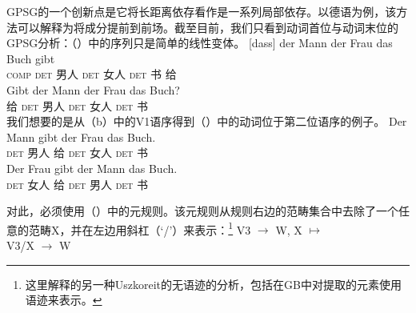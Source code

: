 GPSG的一个创新点是它将长距离依存看作是一系列局部依存\citep{Gazdar81}。以德语为例，该方法可以解释为将成分提前到前场。截至目前，我们只看到动词首位与动词末位的GPSG分析：（）中的序列只是简单的线性变体。
\eal
\ex 
\gll {}[dass] der Mann der Frau das Buch gibt\\
	 {}\spacebr{}\textsc{comp} \textsc{det} 男人 \textsc{det} 女人 \textsc{det} 书 给\\
\ex 
\gll Gibt der Mann der Frau das Buch?\\
	 给 \textsc{det} 男人 \textsc{det} 女人 \textsc{det} 书\\
\zl
我们想要的是从（b）中的V1语序得到（）中的动词位于第二位语序的例子。
\eal
\ex 
\gll Der Mann gibt der Frau das Buch.\\
     \textsc{det} 男人 给  \textsc{det} 女人 \textsc{det} 书\\
\ex 
\gll Der Frau gibt der Mann das Buch.\\
     \textsc{det} 女人 给 \textsc{det} 男人 \textsc{det} 书\\
\zl

\noindent
对此，必须使用（）中的元规则。该元规则从规则右边的范畴集合中去除了一个任意的范畴X，并在左边用斜杠（`/'）\isc{/}\is{/}来表示：\footnote{%
这里解释的另一种Uszkoreit的无语迹的分析\citeyearpar[]{Uszkoreit87a}，包括在GB中对提取的元素使用语迹来表示。
}
\ea
\label{meta-slash-intro}
V3  $\to$ W, X $\mapsto$\\
V3/X  $\to$ W
\z

